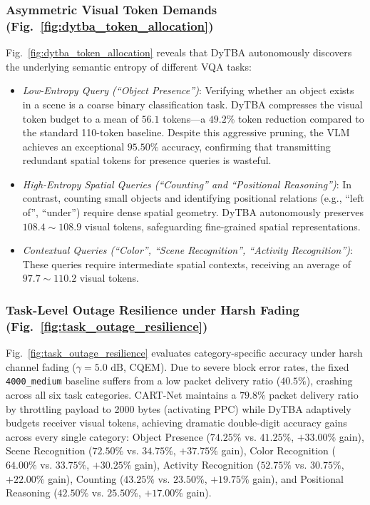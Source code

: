 \subsubsection{Asymmetric Visual Token Demands (Fig.~\ref{fig:dytba_token_allocation})}
Fig.~\ref{fig:dytba_token_allocation} reveals that DyTBA autonomously discovers the underlying semantic entropy of different VQA tasks:
\begin{itemize}
    \item \textit{Low-Entropy Query (``Object Presence'')}: Verifying whether an object exists in a scene is a coarse binary classification task. DyTBA compresses the visual token budget to a mean of $56.1$ tokens---a $49.2\%$ token reduction compared to the standard 110-token baseline. Despite this aggressive pruning, the VLM achieves an exceptional $95.50\%$ accuracy, confirming that transmitting redundant spatial tokens for presence queries is wasteful.
    \item \textit{High-Entropy Spatial Queries (``Counting'' and ``Positional Reasoning'')}: In contrast, counting small objects and identifying positional relations (e.g., ``left of'', ``under'') require dense spatial geometry. DyTBA autonomously preserves $108.4 \sim 108.9$ visual tokens, safeguarding fine-grained spatial representations.
    \item \textit{Contextual Queries (``Color'', ``Scene Recognition'', ``Activity Recognition'')}: These queries require intermediate spatial contexts, receiving an average of $97.7 \sim 110.2$ visual tokens.
\end{itemize}

\subsubsection{Task-Level Outage Resilience under Harsh Fading (Fig.~\ref{fig:task_outage_resilience})}
Fig.~\ref{fig:task_outage_resilience} evaluates category-specific accuracy under harsh channel fading ($\gamma = 5.0\text{ dB}$, CQEM). Due to severe block error rates, the fixed \texttt{4000\_medium} baseline suffers from a low packet delivery ratio ($40.5\%$), crashing across all six task categories. 
CART-Net maintains a $79.8\%$ packet delivery ratio by throttling payload to 2000 bytes (activating PPC) while DyTBA adaptively budgets receiver visual tokens, achieving dramatic double-digit accuracy gains across every single category: Object Presence ($74.25\%$ vs. $41.25\%$, $+33.00\%$ gain), Scene Recognition ($72.50\%$ vs. $34.75\%$, $+37.75\%$ gain), Color Recognition ($64.00\%$ vs. $33.75\%$, $+30.25\%$ gain), Activity Recognition ($52.75\%$ vs. $30.75\%$, $+22.00\%$ gain), Counting ($43.25\%$ vs. $23.50\%$, $+19.75\%$ gain), and Positional Reasoning ($42.50\%$ vs. $25.50\%$, $+17.00\%$ gain).

